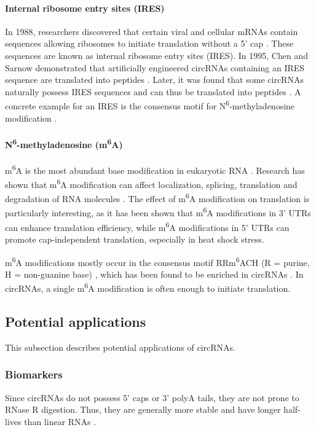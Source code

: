 \paragraph{Internal ribosome entry sites (IRES)}
In 1988, researchers discovered that certain viral and cellular mRNAs contain
sequences allowing ribosomes to initiate translation without a 5' cap
\supercite{pelletier_internal_1988, jang_segment_1988}. These sequences are
known as internal ribosome entry sites (IRES). In 1995, Chen and Sarnow
demonstrated that artificially engineered circRNAs containing an IRES sequence
are translated into peptides \supercite{chen_initiation_1995}. Later, it
was found that some circRNAs naturally possess IRES sequences and can thus be
translated into peptides
\supercite{chen_expanding_2020,legnini_circ-znf609_2017,pamudurti_translation_2017}.
A concrete example for an IRES is the consensus motif for
N\textsuperscript{6}-methyladenosine modification \supercite{yang_extensive_2017}.

\paragraph{N\textsuperscript{6}-methyladenosine (m\textsuperscript{6}A)}
m\textsuperscript{6}A is the most abundant base modification in eukaryotic RNA
\supercite{yang_extensive_2017,li_pivotal_2014,wei_methylated_1975}. Research
has shown that m\textsuperscript{6}A modification can affect localization,
splicing, translation and degradation of RNA molecules
\supercite{yue_rna_2015,meyer_dynamic_2014}. The effect of m\textsuperscript{6}A
modification on translation is particularly interesting, as it has been shown
that m\textsuperscript{6}A modifications in 3' UTRs can enhance translation
efficiency\supercite{wang_n6-methyladenosine_2015}, while m\textsuperscript{6}A
modifications in 5' UTRs can promote cap-independent translation, especially in
heat shock stress\supercite{zhou_dynamic_2015,meyer_5_2015}.

m\textsuperscript{6}A modifications mostly occur in the consensus motif
RRm\textsuperscript{6}ACH (R = purine, H = non-guanine base)
\supercite{csepany_sequence_1990,harper_sequence_1990}, which has been found to
be enriched in circRNAs \supercite{yang_extensive_2017}. In circRNAs, a single
m\textsuperscript{6}A modification is often enough to initiate
translation\supercite{yang_extensive_2017}.

\subsection{Potential applications}
This subsection describes potential applications of circRNAs.

\subsubsection{Biomarkers}
Since circRNAs do not possess 5' caps or 3' polyA tails, they are not prone to
RNase R digestion. Thus, they are generally more stable and have longer
half-lives than linear RNAs \supercite{kristensen_biogenesis_2019}.
